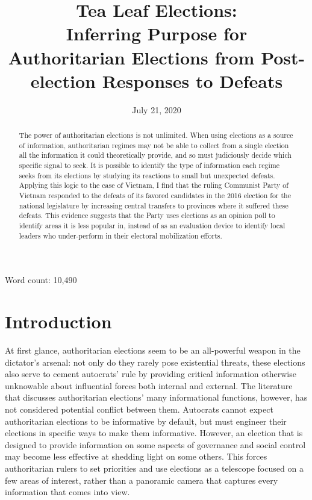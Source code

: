 \documentclass[12pt]{article}
\title{Tea Leaf Elections: \\
	Inferring Purpose for Authoritarian Elections from Post-election Responses to Defeats%
	\\
	\vspace{2ex}
	\vphantom{Online Appendix}}
\date{July 21, 2020}
\newcommand{\1}{\mathbbm{1}}
\begin{document}
	

\maketitle
\thispagestyle{empty}
\doublespacing


\begin{abstract}
The power of authoritarian elections is not unlimited. When using elections as a source of information, authoritarian regimes may not be able to collect from a single election all the information it could theoretically provide, and so must judiciously decide which specific signal to seek. It is possible to identify the type of information each regime seeks from its elections by studying its reactions to small but unexpected defeats. Applying this logic to the case of Vietnam, I find that the ruling Communist Party of Vietnam responded to the defeats of its favored candidates in the 2016 election for the national legislature by increasing central transfers to provinces where it suffered these defeats. This evidence suggests that the Party uses elections as an opinion poll to identify areas it is less popular in, instead of as an evaluation device to identify local leaders who under-perform in their electoral mobilization efforts.
\end{abstract}

Word count: 10,490


\newpage


\section{Introduction}

At first glance, authoritarian elections seem to be an all-powerful weapon in the dictator's arsenal: not only do they rarely pose existential threats, these elections also serve to cement autocrats' rule by providing critical information otherwise unknowable about influential forces both internal and external. The literature that discusses authoritarian elections' many informational functions, however, has not considered potential conflict between them. Autocrats cannot expect authoritarian elections to be informative by default, but must engineer their elections in specific ways to make them informative. However, an election that is designed to provide information on some aspects of governance and social control may become less effective at shedding light on some others. This forces authoritarian rulers to set priorities and use elections as a telescope focused on a few areas of interest, rather than a panoramic camera that captures every information that comes into view.
\end{document}
